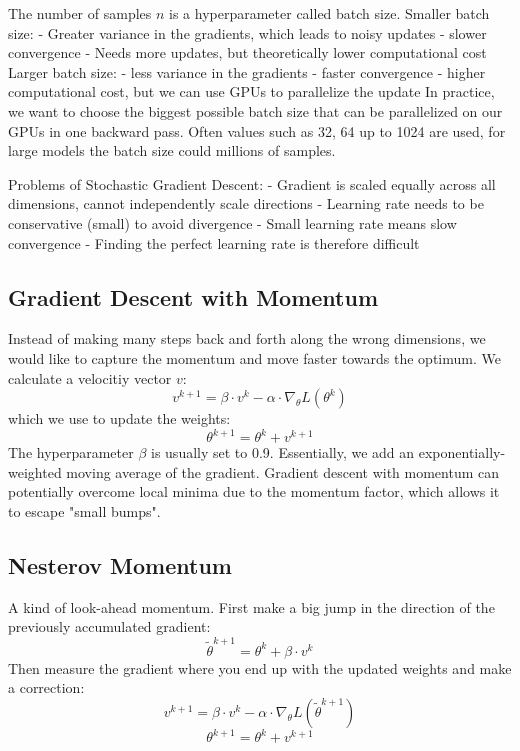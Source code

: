 \documentclass{scrartcl}
\begin{document}
The number of samples $n$ is a hyperparameter called batch size.
Smaller batch size:
- Greater variance in the gradients, which leads to noisy updates
- slower convergence
- Needs more updates, but theoretically lower computational cost
Larger batch size:
- less variance in the gradients
- faster convergence
- higher computational cost, but we can use GPUs to parallelize the update
In practice, we want to choose the biggest possible batch size that can be parallelized on our GPUs in one backward pass. Often values such as 32, 64 up to 1024 are used, for large models the batch size could millions of samples.

Problems of Stochastic Gradient Descent:
- Gradient is scaled equally across all dimensions, cannot independently scale directions
- Learning rate needs to be conservative (small) to avoid divergence
- Small learning rate means slow convergence
- Finding the perfect learning rate is therefore difficult

\subsection*{Gradient Descent with Momentum}
Instead of making many steps back and forth along the wrong dimensions, we would like to capture the momentum and move faster towards the optimum.
We calculate a velocitiy vector $v$:
$$v^{k+1} = \beta \cdot v^k - \alpha \cdot \nabla_\theta L(\theta^k)$$
which we use to update the weights:
$$\theta^{k+1} = \theta^k + v^{k+1}$$
The hyperparameter $\beta$ is usually set to 0.9.
Essentially, we add an exponentially-weighted moving average of the gradient.
Gradient descent with momentum can potentially overcome local minima due to the momentum factor, which allows it to escape "small bumps".

\subsection*{Nesterov Momentum}
A kind of look-ahead momentum.
First make a big jump in the direction of the previously accumulated gradient:
$$\widetilde{\theta}^{k+1} = \theta^k + \beta \cdot v^k$$
Then measure the gradient where you end up with the updated weights and make a correction:
$$v^{k+1} = \beta \cdot v^k - \alpha \cdot \nabla_\theta L(\widetilde{\theta}^{k+1})$$
$$\theta^{k+1} = \theta^k + v^{k+1}$$
\end{document}
